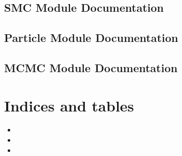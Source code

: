 \documentclass[letterpaper,10pt,english]{sphinxmanual}
\begin{document}
\section{SMC Module Documentation}
\label{\detokenize{source_code:module-smcpy}}\label{\detokenize{source_code:smc-module-documentation}}

\section{Particle Module Documentation}
\label{\detokenize{source_code:module-smcpy.particles}}\label{\detokenize{source_code:particle-module-documentation}}

\section{MCMC Module Documentation}
\label{\detokenize{source_code:module-smcpy.mcmc}}\label{\detokenize{source_code:mcmc-module-documentation}}

\chapter{Indices and tables}
\label{\detokenize{index:indices-and-tables}}\begin{itemize}
\item {} 

\item {} 

\item {} 

\end{itemize}


\renewcommand{\indexname}{Python Module Index}
\begin{sphinxtheindex}
\let\bigletter\sphinxstyleindexlettergroup
\bigletter{s}
\item\relax{}
\item\relax{}
\item\relax{}
\end{sphinxtheindex}

\renewcommand{\indexname}{Index}
\printindex
\end{document}
